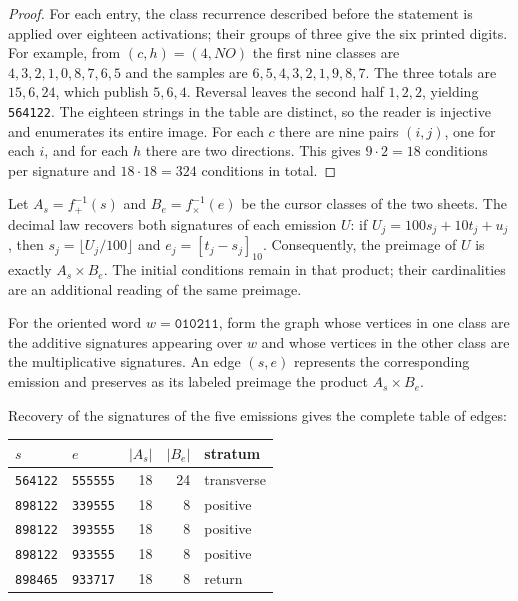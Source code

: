 \begin{proof}
For each entry, the class recurrence described before the
statement is applied over eighteen activations; their groups of three give the six
printed digits. For example, from $(c,h)=(4,NO)$ the first nine
classes are $4,3,2,1,0,8,7,6,5$ and the samples are
$6,5,4,3,2,1,9,8,7$. The three totals are $15,6,24$, which publish
$5,6,4$. Reversal leaves the second half $1,2,2$, yielding
\texttt{564122}. The eighteen strings in the table are distinct,
so the reader is injective and enumerates its entire image. For each
$c$ there are nine pairs $(i,j)$, one for each $i$, and for each $h$ there are
two directions. This gives $9\cdot2=18$ conditions per signature and
$18\cdot18=324$ conditions in total.
\end{proof}

Let $A_s=f_+^{-1}(s)$ and $B_e=f_\times^{-1}(e)$ be the cursor classes
of the two sheets. The decimal law recovers both signatures of each emission
$U$: if $U_j=100s_j+10t_j+u_j$, then
$s_j=\lfloor U_j/100\rfloor$ and $e_j=[t_j-s_j]_{10}$.
Consequently, the preimage of $U$ is exactly $A_s\times B_e$.
The initial conditions remain in that product; their cardinalities
are an additional reading of the same preimage.

\begin{definition}
For the oriented word $w=\texttt{010211}$, form the graph whose
vertices in one class are the additive signatures appearing over $w$ and
whose vertices in the other class are the multiplicative signatures. An
edge $(s,e)$ represents the corresponding emission and preserves as
its labeled preimage the product $A_s\times B_e$.
\end{definition}

Recovery of the signatures of the five emissions gives the complete table
of edges:
\begin{center}
\begin{tabular}{llrrl}
\toprule
$s$&$e$&$|A_s|$&$|B_e|$&stratum\\
\midrule
\texttt{564122}&\texttt{555555}&18&24&transverse\\
\texttt{898122}&\texttt{339555}&18&8&positive\\
\texttt{898122}&\texttt{393555}&18&8&positive\\
\texttt{898122}&\texttt{933555}&18&8&positive\\
\texttt{898465}&\texttt{933717}&18&8&return\\
\bottomrule
\end{tabular}
\end{center}

